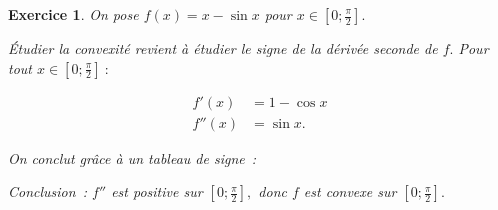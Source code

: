 \documentclass[10pt]{article}
\newtheorem{exo}{Exercice}
\begin{document}
\begin{exo}

On pose $f(x)=x-\sin x$ pour $x\in\left[0;\frac{\pi}{2}\right].$

\medskip

Étudier la convexité revient à étudier le signe de la dérivée seconde de $f.$ Pour tout  $x\in\left[0;\frac{\pi}{2}\right]~:$

\begin{align*}
f'(x)&=1-\cos x\\
f''(x)&=\sin x.
\end{align*}

On conclut grâce à un tableau de signe~:


\medskip
\begin{center}
\end{center}

\medskip

Conclusion~: $f''$ est positive sur $\left[0;\frac{\pi}{2}\right],$ donc $f$ est convexe sur $\left[0;\frac{\pi}{2}\right].$

\end{exo}
\end{document}
